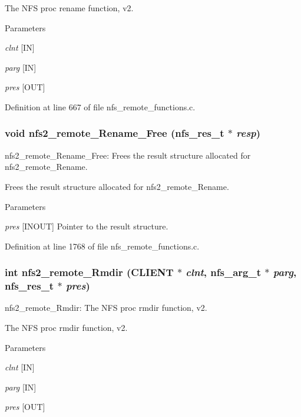 The NFS proc rename function, v2.


\begin{DoxyParams}{Parameters}
\item[{\em clnt}][IN] \item[{\em parg}][IN] \item[{\em pres}][OUT] \end{DoxyParams}


Definition at line 667 of file nfs\_\-remote\_\-functions.c.
\subsubsection[{nfs2\_\-remote\_\-Rename\_\-Free}]{\setlength{\rightskip}{0pt plus 5cm}void nfs2\_\-remote\_\-Rename\_\-Free (nfs\_\-res\_\-t $\ast$ {\em resp})}\label{group__NFSprocs_gaa709a659e9a83e6a9c5c6c318efbca62}
nfs2\_\-remote\_\-Rename\_\-Free: Frees the result structure allocated for nfs2\_\-remote\_\-Rename.

Frees the result structure allocated for nfs2\_\-remote\_\-Rename.


\begin{DoxyParams}{Parameters}
\item[{\em pres}][INOUT] Pointer to the result structure. \end{DoxyParams}


Definition at line 1768 of file nfs\_\-remote\_\-functions.c.
\subsubsection[{nfs2\_\-remote\_\-Rmdir}]{\setlength{\rightskip}{0pt plus 5cm}int nfs2\_\-remote\_\-Rmdir (CLIENT $\ast$ {\em clnt}, \/  nfs\_\-arg\_\-t $\ast$ {\em parg}, \/  nfs\_\-res\_\-t $\ast$ {\em pres})}\label{group__NFSprocs_gaf8ef3a38a9b98e3910ee9e264b6b2f03}
nfs2\_\-remote\_\-Rmdir: The NFS proc rmdir function, v2.

The NFS proc rmdir function, v2.


\begin{DoxyParams}{Parameters}
\item[{\em clnt}][IN] \item[{\em parg}][IN] \item[{\em pres}][OUT] \end{DoxyParams}


